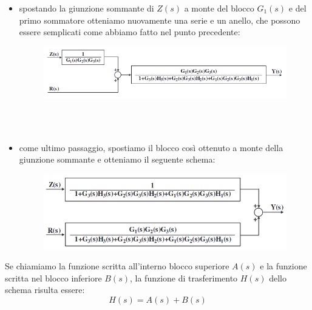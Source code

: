 \documentclass[12pt,a4paper]{article}
\begin{document}
\begin{itemize}
\begin{figure}[h!]
		\end{figure}
		\item spostando la giunzione sommante di $Z(s)$ a monte del blocco $G_1(s)$ e del primo sommatore otteniamo nuovamente una serie e un anello, che possono essere semplicati come abbiamo fatto nel punto precedente:
		\begin{figure}[h!]
			\centering
			\includegraphics[scale=0.4]{./images/schema26_8.png}
		\end{figure}
		\\ \\
		\item come ultimo passaggio, spostiamo il blocco cos\`i ottenuto a monte della giunzione sommante e otteniamo il seguente schema:
		\begin{figure}[h!]
			\centering
			\includegraphics[scale=0.4]{./images/schema26_9.png}
		\end{figure}
	\end{itemize}
	Se chiamiamo la funzione scritta all'interno blocco superiore $A(s)$ e la funzione scritta nel blocco inferiore $B(s)$, la funzione di trasferimento $H(s)$ dello schema risulta essere:
	\[
		H(s) = A(s) + B(s)
	\]
	\newpage
\end{document}
